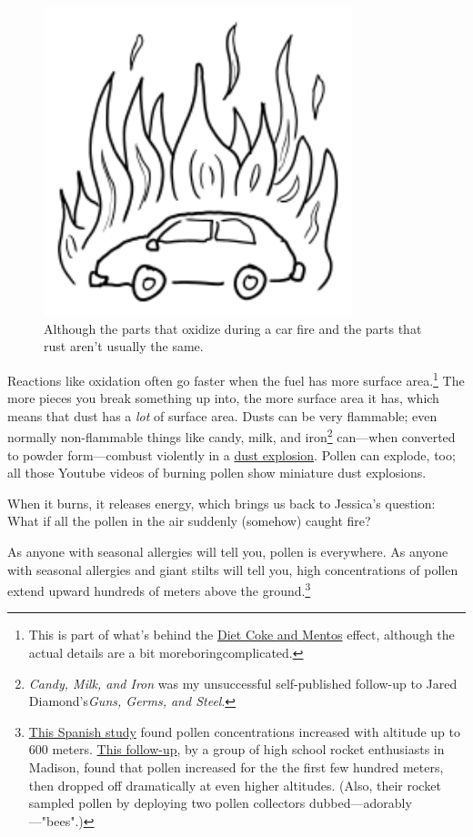 {\begin{figure}[!htbp]
\centering
\includegraphics[scale=0.5, max width=0.8\textwidth]{imgs/a/97/car.png}
\caption{Although the parts that oxidize during a car fire and the parts that rust aren't usually the same.}
\end{figure}

{Reactions like oxidation often go faster when the fuel has more surface area.{\footnote{This is part of what's behind the \href{http://planck.lal.in2p3.fr/wiki/uploads/Photos/Activit\%E9esClandestines/Coffey08\_diet\_coke\_and\_mentos.pdf}{Diet Coke and Mentos} effect, although the actual details are a bit moreboringcomplicated.} } The more pieces you break something up into, the more surface area it has, which means that dust has a \emph{lot} of surface area. Dusts can be very flammable; even normally non-flammable things like candy, milk, and iron{\footnote{ \emph{Candy, Milk, and Iron} was my unsuccessful self-published follow-up to Jared Diamond's\emph{Guns, Germs, and Steel}.} } can—when converted to powder form—combust violently in a \href{https://www.osha.gov/Publications/combustibledustposter.pdf} {dust explosion}. Pollen can explode, too; all those Youtube videos of burning pollen show miniature dust explosions.}

{When it burns, it releases energy, which brings us back to Jessica's question: What if all the pollen in the air suddenly (somehow) caught fire?}

{As anyone with seasonal allergies will tell you, pollen is everywhere. As anyone with seasonal allergies and giant stilts will tell you, high concentrations of pollen extend upward hundreds of meters above the ground.{\footnote{ \href{http://link.springer.com/article/10.1023\%2FA\%3A1007685513925}{This Spanish study} found pollen concentrations increased with altitude up to 600 meters. \href{http://westrocketry.com/sli2008/PLAR\_MadisonWest2008.pdf} {This follow-up}, by a group of high school rocket enthusiasts in Madison, found that pollen increased for the the first few hundred meters, then dropped off dramatically at even higher altitudes. (Also, their rocket sampled pollen by deploying two pollen collectors dubbed—adorably—"bees".)} } }

}

